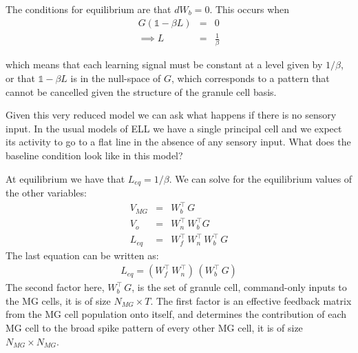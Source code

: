 \documentclass[11pt]{article}
\begin{document}
The conditions for equilibrium are that $dW_b =0$. This occurs when
\begin{eqnarray*}
	G\left( \mathds{1} - \beta L \right) &=& 0 \\ 
	\implies L &=& \frac{1}{\beta}
\end{eqnarray*}

which means that each learning signal must be constant at a level given by $1/ \beta$, or that $\mathds{1} - \beta L$ is in the null-space of $G$, which corresponds to a pattern that cannot be cancelled given the structure of the granule cell basis. 

Given this very reduced model we can ask what happens if there is no sensory input. In the usual models of ELL we have a single principal cell and we expect its activity to go to a flat line in the absence of any sensory input. What does the baseline condition look like in this model?

At equilibrium we have that $L_{eq} = 1 / \beta$. We can solve for the equilibrium values of the other variables:
\begin{eqnarray*}
	V_{MG} &=& W_b^\intercal \, G \\
	V_o &=& W_n^\intercal \, W_b^\intercal G \\
	L_{eq} &=& W_f^\intercal \, W_n^\intercal \, W_b^\intercal \, G
\end{eqnarray*}
The last equation can be written as:
\begin{eqnarray*}
	L_{eq} = \left( W_f^\intercal \, W_n^\intercal \right) \, \left( W_b^\intercal \, G \right)
\end{eqnarray*}
The second factor here, $W_b^\intercal \, G$, is the set of granule cell, command-only inputs to the MG cells, it is of size $N_{MG} \times T$. The first factor is an effective feedback matrix from the MG cell population onto itself, and determines the contribution of each MG cell to the broad spike pattern of every other MG cell, it is of size $N_{MG} \times N_{MG}$.
\end{document}
